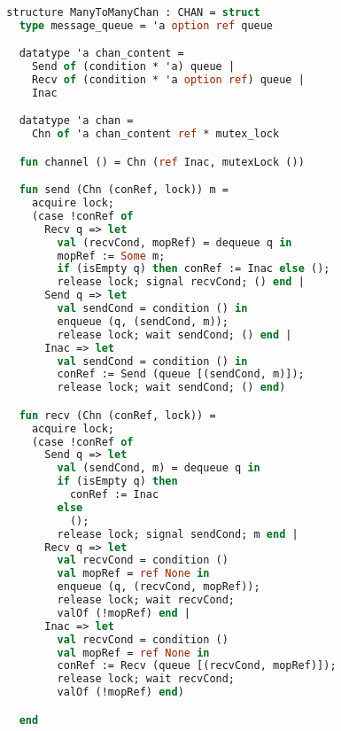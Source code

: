 \documentclass{article}
\begin{document}
\begin{lstlisting}[language=ML, style=codestyle1]

  structure ManyToManyChan : CHAN = struct
    type message_queue = 'a option ref queue

    datatype 'a chan_content = 
      Send of (condition * 'a) queue | 
      Recv of (condition * 'a option ref) queue | 
      Inac

    datatype 'a chan =
      Chn of 'a chan_content ref * mutex_lock 

    fun channel () = Chn (ref Inac, mutexLock ())

    fun send (Chn (conRef, lock)) m = 
      acquire lock;
      (case !conRef of
        Recv q => let
          val (recvCond, mopRef) = dequeue q in
          mopRef := Some m;
          if (isEmpty q) then conRef := Inac else (); 
          release lock; signal recvCond; () end |
        Send q => let
          val sendCond = condition () in
          enqueue (q, (sendCond, m));
          release lock; wait sendCond; () end |
        Inac => let
          val sendCond = condition () in
          conRef := Send (queue [(sendCond, m)]);
          release lock; wait sendCond; () end)

    fun recv (Chn (conRef, lock)) =  
      acquire lock;
      (case !conRef of 
        Send q => let
          val (sendCond, m) = dequeue q in
          if (isEmpty q) then
            conRef := Inac
          else
            (); 
          release lock; signal sendCond; m end |
        Recv q => let
          val recvCond = condition ()
          val mopRef = ref None in
          enqueue (q, (recvCond, mopRef));
          release lock; wait recvCond;
          valOf (!mopRef) end |
        Inac => let
          val recvCond = condition ()
          val mopRef = ref None in
          conRef := Recv (queue [(recvCond, mopRef)]);
          release lock; wait recvCond;
          valOf (!mopRef) end)

    end

  \end{lstlisting}
\end{document}
